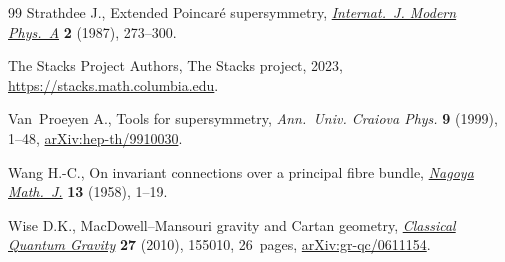 \documentclass[10pt,a4paper]{amsart}
\providecommand{\LastPageEnding}{}
\numberwithin{equation}{section}
\newcommand{\1}{\mathbbm{1}}
\begin{document}
\begin{thebibliography}{99}
Strathdee J., Extended {P}oincar\'e supersymmetry,
 \href{https://doi.org/10.1142/S0217751X87000120}{\textit{Internat.~J. Modern
 Phys.~A}} \textbf{2} (1987), 273--300.

{The Stacks Project Authors}, The Stacks project, 2023, \url{https://stacks.math.columbia.edu}.

Van~Proeyen A., Tools for supersymmetry, \textit{Ann.~Univ. Craiova Phys.}
 \textbf{9} (1999), 1--48,
 \href{http://arxiv.org/abs/hep-th/9910030}{arXiv:hep-th/9910030}.

Wang H.-C., On invariant connections over a principal fibre bundle,
 \href{https://doi.org/10.1017/S0027763000023461}{\textit{Nagoya Math.~J.}}
 \textbf{13} (1958), 1--19.

Wise D.K., Mac{D}owell--{M}ansouri gravity and {C}artan geometry,
 \href{https://doi.org/10.1088/0264-9381/27/15/155010}{\textit{Classical
 Quantum Gravity}} \textbf{27} (2010), 155010, 26~pages,
 \href{http://arxiv.org/abs/gr-qc/0611154}{arXiv:gr-qc/0611154}.

\end{thebibliography}\LastPageEnding
\end{document}
